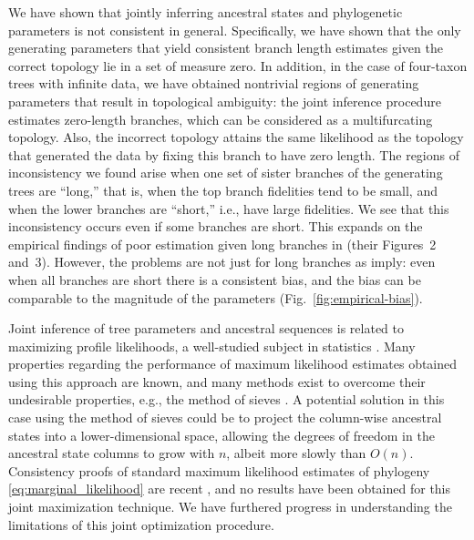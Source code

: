 \documentclass[11pt]{article}
\newcommand{\nCols}{n}
\begin{document}
We have shown that jointly inferring ancestral states and phylogenetic parameters \citep{Sagulenko2018-xl} is not consistent in general.
Specifically, we have shown that the only generating parameters that yield consistent branch length estimates given the correct topology lie in a set of measure zero.
In addition, in the case of four-taxon trees with infinite data, we have obtained nontrivial regions of generating parameters that result in topological ambiguity: the joint inference procedure estimates zero-length branches, which can be considered as a multifurcating topology.
Also, the incorrect topology attains the same likelihood as the topology that generated the data by fixing this branch to have zero length.
The regions of inconsistency we found arise when one set of sister branches of the generating trees are ``long,'' that is, when the top branch fidelities tend to be small, and when the lower branches are ``short,'' i.e., have large fidelities.
We see that this inconsistency occurs even if some branches are short.
This expands on the empirical findings of poor estimation given long branches in \citet{Sagulenko2018-xl} (their Figures~2 and~3).
However, the problems are not just for long branches as \citet{Sagulenko2018-xl} imply: even when all branches are short there is a consistent bias, and the bias can be comparable to the magnitude of the parameters (Fig.~\ref{fig:empirical-bias}).

Joint inference of tree parameters and ancestral sequences is related to maximizing profile likelihoods, a well-studied subject in statistics \citep{Murphy2000-ry}.
Many properties regarding the performance of maximum likelihood estimates obtained using this approach are known, and many methods exist to overcome their undesirable properties, e.g., the method of sieves \citep{Geman1982}.
A potential solution in this case using the method of sieves could be to project the column-wise ancestral states into a lower-dimensional space, allowing the degrees of freedom in the ancestral state columns to grow with $\nCols$, albeit more slowly than $O(\nCols)$.
Consistency proofs of standard maximum likelihood estimates of phylogeny \eqref{eq:marginal_likelihood} are recent \citep{Allman2008-wd,Chai2011-ff,RoyChoudhury2015-ta}, and no results have been obtained for this joint maximization technique.
We have furthered progress in understanding the limitations of this joint optimization procedure.
\end{document}

